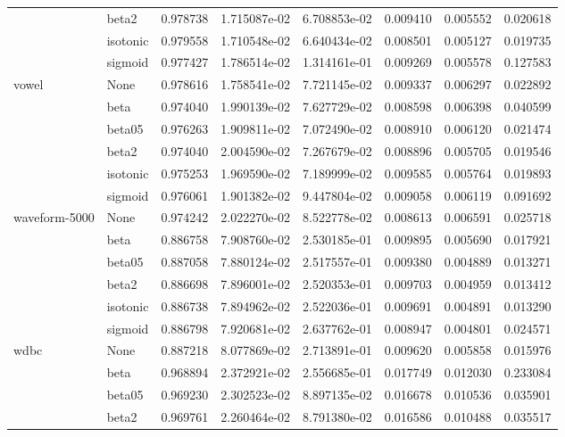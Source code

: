 \begin{tabular}{llrrrrrr}
        & beta2 &  0.978738 &  1.715087e-02 &  6.708853e-02 &  0.009410 &  0.005552 &  0.020618 \\
        & isotonic &  0.979558 &  1.710548e-02 &  6.640434e-02 &  0.008501 &  0.005127 &  0.019735 \\
        & sigmoid &  0.977427 &  1.786514e-02 &  1.314161e-01 &  0.009269 &  0.005578 &  0.127583 \\
vowel & None &  0.978616 &  1.758541e-02 &  7.721145e-02 &  0.009337 &  0.006297 &  0.022892 \\
        & beta &  0.974040 &  1.990139e-02 &  7.627729e-02 &  0.008598 &  0.006398 &  0.040599 \\
        & beta05 &  0.976263 &  1.909811e-02 &  7.072490e-02 &  0.008910 &  0.006120 &  0.021474 \\
        & beta2 &  0.974040 &  2.004590e-02 &  7.267679e-02 &  0.008896 &  0.005705 &  0.019546 \\
        & isotonic &  0.975253 &  1.969590e-02 &  7.189999e-02 &  0.009585 &  0.005764 &  0.019893 \\
        & sigmoid &  0.976061 &  1.901382e-02 &  9.447804e-02 &  0.009058 &  0.006119 &  0.091692 \\
waveform-5000 & None &  0.974242 &  2.022270e-02 &  8.522778e-02 &  0.008613 &  0.006591 &  0.025718 \\
        & beta &  0.886758 &  7.908760e-02 &  2.530185e-01 &  0.009895 &  0.005690 &  0.017921 \\
        & beta05 &  0.887058 &  7.880124e-02 &  2.517557e-01 &  0.009380 &  0.004889 &  0.013271 \\
        & beta2 &  0.886698 &  7.896001e-02 &  2.520353e-01 &  0.009703 &  0.004959 &  0.013412 \\
        & isotonic &  0.886738 &  7.894962e-02 &  2.522036e-01 &  0.009691 &  0.004891 &  0.013290 \\
        & sigmoid &  0.886798 &  7.920681e-02 &  2.637762e-01 &  0.008947 &  0.004801 &  0.024571 \\
wdbc & None &  0.887218 &  8.077869e-02 &  2.713891e-01 &  0.009620 &  0.005858 &  0.015976 \\
        & beta &  0.968894 &  2.372921e-02 &  2.556685e-01 &  0.017749 &  0.012030 &  0.233084 \\
        & beta05 &  0.969230 &  2.302523e-02 &  8.897135e-02 &  0.016678 &  0.010536 &  0.035901 \\
        & beta2 &  0.969761 &  2.260464e-02 &  8.791380e-02 &  0.016586 &  0.010488 &  0.035517 \\

\end{tabular}
